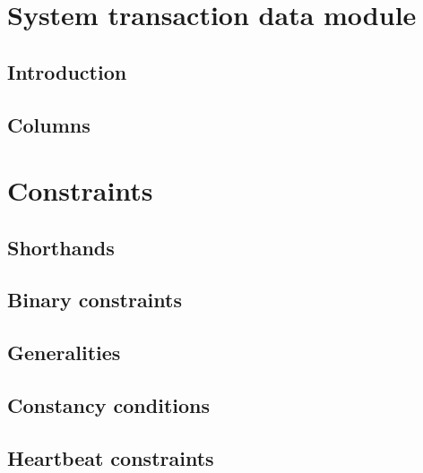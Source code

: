 
\section{System transaction data module}          \label{system transactions: generalities}
\subsection{Introduction}                         \label{system transactions: generalities: intro}             
\subsection{Columns}                              \label{system transactions: generalities: columns}           

\section{Constraints}                             \label{system transactions: constraints}    
\subsection{Shorthands}                           \label{system transactions: constraints: shorthands}         
\subsection{Binary constraints}                   \label{system transactions: constraints: binary}             
\subsection{Generalities}                         \label{system transactions: constraints: generalities}       
\subsection{Constancy conditions}                 \label{system transactions: constraints: constancies}        
\subsection{Heartbeat constraints}                \label{system transactions: constraints: heartbeat}          


